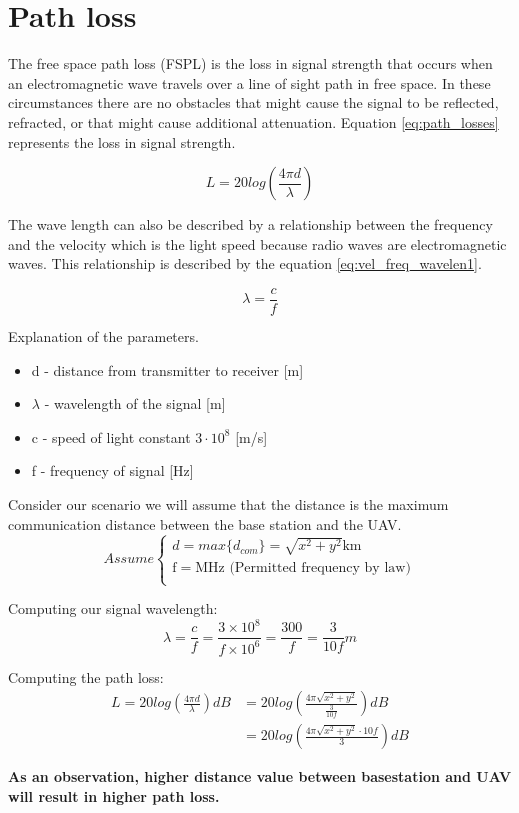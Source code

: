 \chapter{Path loss}\label{ch:path_loss}

The free space path loss (FSPL) is the loss in signal strength that occurs when an electromagnetic wave travels over a line of sight path in free space. In these circumstances there are no obstacles that might cause the signal to be reflected, refracted, or that might cause additional attenuation. Equation \ref{eq:path_losses} represents the loss in signal strength.

\begin{equation}\label{eq:path_losses}
L = 20log\left (\frac{4\pi d}{\lambda} \right)
\end{equation}

The wave length can also be described by a relationship between the frequency and the velocity which is the light speed because radio waves are electromagnetic waves. This relationship is described by the equation \ref{eq:vel_freq_wavelen1}.

\begin{equation}\label{eq:vel_freq_wavelen1}
\lambda = \frac{c}{f}
\end{equation}


Explanation of the parameters.
\begin{itemize}
\item d - distance from transmitter to receiver [m]
\item $\lambda$ - wavelength of the signal [m]
\item c - speed of light constant $3\cdot 10^8$ [m/s] 
\item f - frequency of signal [Hz]
\end{itemize}

Consider our scenario we will assume that the distance is the maximum communication distance between the base station and the UAV. 
\begin{equation*}
Assume \begin{cases}
d = max\{ d_{com} \} = \sqrt{x^2+y^2} \text{km}\\
\text{f} = \text{MHz (Permitted frequency by law})\\
\end{cases}
\end{equation*}

Computing our signal wavelength:
\begin{equation}\label{eq:vel_freq_wavelen2}
\lambda = \frac{c}{f} = \frac{3\times 10^{8}}{f\times 10^{6}}=\frac{300}{f}=\frac{3}{10f}m
\end{equation}

Computing the path loss:
\begin{align*}\label{eq:path_loses_calc}
L = 20log\left (\frac{4\pi d}{\lambda} \right) dB &= 20log\left (\frac{4\pi \sqrt{x^2+y^2}}{\frac{3}{10f}} \right) dB \\ 
&= 20log\left (\frac{4\pi \sqrt{x^2+y^2}\cdot 10f}{ 3} \right) dB
\end{align*}

\noindent \textbf{As an observation, higher distance value between basestation and UAV will result in higher path loss.}
